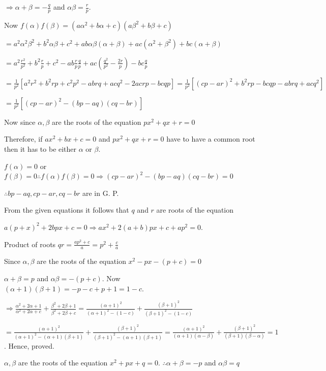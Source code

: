   $\Rightarrow \alpha + \beta = -\frac{q}{p}$ and $\alpha\beta = \frac{r}{p}$.

  Now $f(\alpha)f(\beta) = (a\alpha^2 + b\alpha + c)(a\beta^2 + b\beta + c)$

  $= a^2\alpha^2\beta^2 + b^2\alpha\beta + c^2 + ab\alpha\beta(\alpha + \beta) + ac(\alpha^2 + \beta^2) +
  bc(\alpha + \beta)$

  $= a^2\frac{r^2}{p^2} + b^2\frac{r}{p} + c^2 - ab\frac{r}{p}\frac{q}{p} + ac\left(\frac{q^2}{p^2} -
  \frac{2r}{p}\right) - bc\frac{q}{p}$

  $= \frac{1}{p^2}[a^2r^2 + b^2rp + c^2p^2 - abrq + acq^2 - 2acrp - bcqp] = \frac{1}{p^2}[(cp - ar)^2 +
    b^2rp - bcqp - abrq + acq^2]$

  $= \frac{1}{p^2}[(cp - ar)^2 - (bp - aq)(cq - br)]$

  Now since $\alpha, \beta$ are the roots of the equation $px^2 + qx + r = 0$

  Therefore, if $ax^2 + bx + c = 0$ and $px^2 + qx + r = 0$ have to have a common root then it has to be
  either $\alpha$ or $\beta$.

  $f(\alpha) = 0$ or $f(\beta) = 0 \therefore f(\alpha)f(\beta) = 0\Rightarrow (cp - ar)^2 - (bp - aq)(cq -
  br) = 0$

  $\therefore bp - aq, cp - ar, cq - br$ are in G. P.
\item From the given equations it follows that $q$ and $r$ are roots of the equation

  $a(p + x)^2 + 2bpx + c = 0 \Rightarrow ax^2 + 2(a + b)px + c + ap^2 = 0$.

  Product of roots $qr = \frac{ap^2 + c}{a} = p^2 + \frac{c}{a}$
\item Since $\alpha, \beta$ are the roots of the equation $x^2 - px - (p + c) = 0$

  $\alpha + \beta = p$ and $\alpha\beta = -(p + c)$. Now $(\alpha + 1)(\beta + 1) = -p - c + p + 1 = 1 - c$.

  $\Rightarrow \frac{\alpha^2 + 2\alpha + 1}{\alpha^2 + 2\alpha + c} + \frac{\beta^2 + 2\beta + 1}{\beta^2 +
  2\beta + c} = \frac{(\alpha + 1)^2}{(\alpha + 1)^2 - (1 - c)} + \frac{(\beta + 1)^2}{(\beta + 1)^2 - (1 -
    c)}$

  $= \frac{(\alpha + 1)^2}{(\alpha + 1)^2 - (\alpha + 1)(\beta + 1)} + \frac{(\beta + 1)^2}{(\beta + 1)^2 -
    (\alpha + 1)(\beta + 1)} = \frac{(\alpha + 1)^2}{(\alpha + 1)(\alpha - \beta)} + \frac{(\beta +
  1)^2}{(\beta + 1)(\beta - \alpha)} = 1$. Hence, proved.
\item $\alpha, \beta$ are the roots of the equation $x^2 + px + q = 0$. $\therefore \alpha + \beta = -p$ and
  $\alpha\beta = q$

